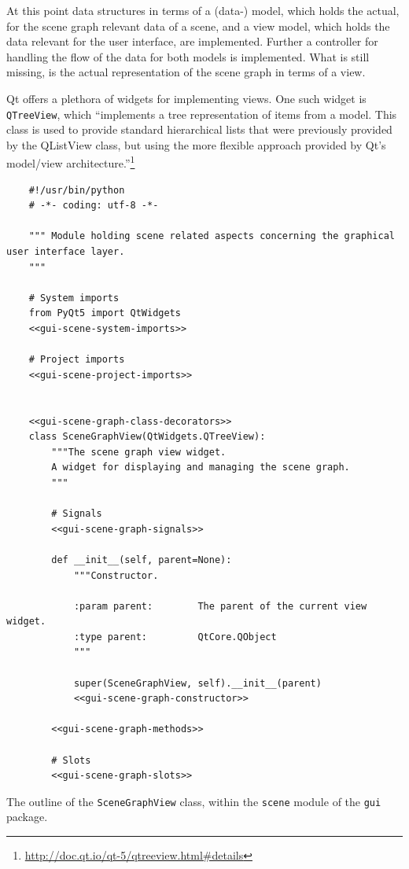 \documentclass[10pt, openright, notitlepage]{scrreprt}
\begin{document}
At this point data structures in terms of a (data-) model, which holds the
actual, for the scene graph relevant data of a scene, and a view model, which
holds the data relevant for the user interface, are implemented. Further a
controller for handling the flow of the data for both models is implemented.
What is still missing, is the actual representation of the scene graph in terms
of a view.

Qt offers a plethora of widgets for implementing views. One such widget is
\texttt{QTreeView}, which ``implements a tree representation of items from a
model. This class is used to provide standard hierarchical lists that were
previously provided by the QListView class, but using the more flexible approach
provided by Qt's model/view
architecture.''\footnote{\url{http://doc.qt.io/qt-5/qtreeview.html\#details}}

\begin{listing}[H]
\begin{verbatim}
    #!/usr/bin/python
    # -*- coding: utf-8 -*-
    
    """ Module holding scene related aspects concerning the graphical user interface layer.
    """
    
    # System imports
    from PyQt5 import QtWidgets
    <<gui-scene-system-imports>>
    
    # Project imports
    <<gui-scene-project-imports>>
    
    
    <<gui-scene-graph-class-decorators>>
    class SceneGraphView(QtWidgets.QTreeView):
        """The scene graph view widget.
        A widget for displaying and managing the scene graph.
        """
    
        # Signals
        <<gui-scene-graph-signals>>
    
        def __init__(self, parent=None):
            """Constructor.
    
            :param parent:        The parent of the current view widget.
            :type parent:         QtCore.QObject
            """
    
            super(SceneGraphView, self).__init__(parent)
            <<gui-scene-graph-constructor>>
    
        <<gui-scene-graph-methods>>
    
        # Slots
        <<gui-scene-graph-slots>>
\end{verbatim}
\caption{\label{fig:gui-scene-graph}
The outline of the \texttt{SceneGraphView} class, within the \texttt{scene} module of the \texttt{gui} package.}
\end{listing}
\end{document}
